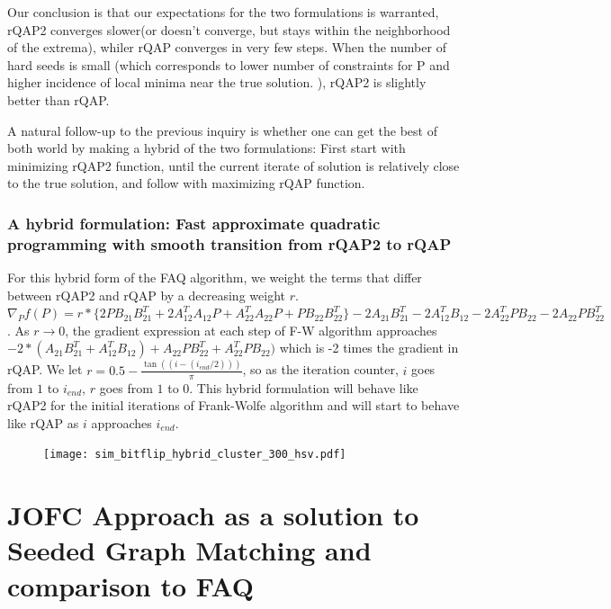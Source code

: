 \documentclass[12pt,oneside,final]{thesis}\usepackage[]{graphicx}\usepackage[]{color}
\begin{document}
Our conclusion is that our expectations for the two formulations is warranted, rQAP2   converges slower(or doesn't converge, but stays within the neighborhood of the extrema), whiler rQAP converges in very few steps. When the number of hard seeds is small (which corresponds to lower number of constraints for P and higher incidence of local minima near the true solution. ), rQAP2 is slightly better than rQAP.


A natural follow-up to the previous inquiry is whether one can get the best of both world by making a hybrid of the two formulations: First start with minimizing rQAP2 function, until the current iterate of solution is relatively close to the true solution, and follow with maximizing rQAP function. 


\subsection{A hybrid formulation: Fast approximate quadratic programming with smooth transition from rQAP2 to rQAP \label{subsec:hybrid}}

For this hybrid form of the FAQ algorithm, we weight the terms that differ between rQAP2 and rQAP by a decreasing weight $r$. $\nabla_{P}f(P)=
r*\{2PB_{21}B_{21}^{T}
+2A_{12}^{T}A_{12}P
+A_{22}^{T}A_{22}P
+PB_{22}B_{22}^{T}\}
-2A_{21}B_{21}^{T}-2A_{12}^{T}B_{12}
-2A_{22}^{T}PB_{22}-2A_{22}PB_{22}^{T}$. As $r \rightarrow 0 $, the gradient expression at each step of F-W algorithm approaches
$-2*(A_{21}B_{21}^T+A_{12}^TB_{12})+A_{22}PB_{22}^T+A_{22}^TPB_{22})$ which is -2 times the gradient in rQAP. We let $r= 0.5- \frac{\tan((i-(i_{end}/2)))}{\pi}$, so as the iteration counter, $i$ goes from $1$ to $i_{end}$, $r$ goes from $1$ to $0$. This hybrid formulation will behave like rQAP2 for the initial iterations of Frank-Wolfe algorithm and will start to behave like rQAP as $i$ approaches $i_{end}$.


\begin{figure}
 \centering
  \caption{
 \label{fig:hybrid}}
 \texttt{[image: sim\_bitflip\_hybrid\_cluster\_300\_hsv.pdf]}
\end{figure}



\chapter{JOFC Approach as a solution to Seeded Graph Matching and comparison to FAQ}
\label{sec:sgm-jofc}
\end{document}
